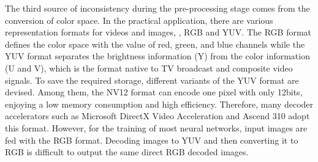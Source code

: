 




The third source of inconsistency during the pre-processing stage comes from the conversion of color space. In the practical application, there are various representation formats for videos and images, \eg, RGB and YUV. The RGB format defines the color space with the value of red, green, and blue channels while the YUV format separates the brightness information (Y) from the color information (U and V), which is the format native to TV broadcast and composite video signals. To save the required storage, different variants of the YUV format are devised. Among them, the NV12 format can encode one pixel with only 12bits, enjoying a low memory consumption and high efficiency. Therefore, many decoder accelerators such as Microsoft DirectX Video Acceleration and Ascend 310 adopt this format. However, for the training of most neural networks, input images are fed with the RGB format. Decoding images to YUV and then converting it to RGB is difficult to output the same direct RGB decoded images. 




